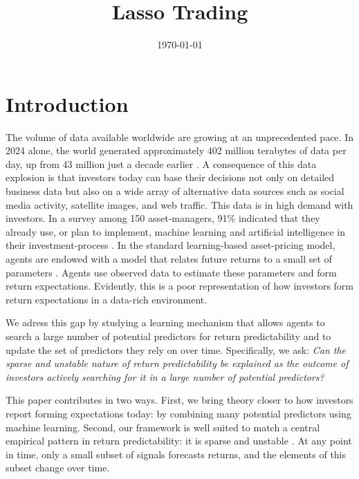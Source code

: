 \documentclass[11pt]{article}
\title{Lasso Trading}
\author{}
\date{\today}
\begin{document}

{
\maketitle
\centering
}

\section{Introduction}

The volume of data available worldwide are growing at an unprecedented pace.
In 2024 alone, the world generated approximately 402 million terabytes of data per day, up from 43 million just a decade earlier \citep{DataSphere2025}.
A consequence of this data explosion is that investors today can base their decisions not only on detailed business data but also on a wide array of alternative data sources such as social media activity, satellite images, and web traffic.
This data is in high demand with investors.
In a survey among 150 asset-managers, 91\% indicated that they already use, or plan to implement, machine learning and artificial intelligence in their investment-process \citep{Mercer2024AI}.
In the standard learning-based asset-pricing model, agents are endowed with a model that relates future returns to a small set of parameters \citep{Timmermann1993,hong2007simple}.
Agents use observed data to estimate these parameters and form return expectations.
Evidently, this is a poor representation of how investors form return expectations in a data-rich environment.

We adress this gap by studying a learning mechanism that allows agents to search a large number of potential predictors for return predictability and to update the set of predictors they rely on over time.
Specifically, we ask: \emph{Can the sparse and unstable nature of return predictability be explained as the outcome of investors actively searching for it in a large number of potential predictors?} 

This paper contributes in two ways.
First, we bring theory closer to how investors report forming expectations today: by combining many potential predictors using machine learning.
Second, our framework is well suited to match a central empirical pattern in return predictability: it is sparse and unstable \citep{Chinco2019,Farmer2023}.
At any point in time, only a small subset of signals forecasts returns, and the elements of this subset change over time.
\end{document}
